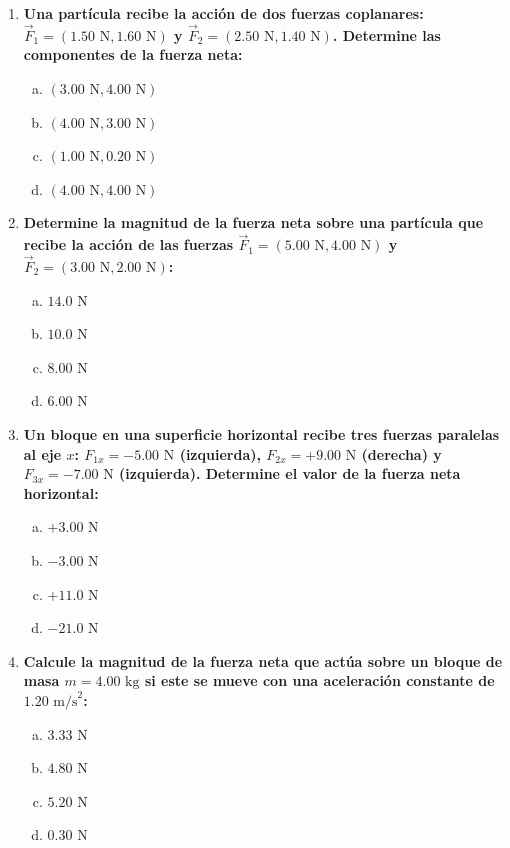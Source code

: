 \documentclass[11pt,a4paper]{article}
\begin{document}
\begin{enumerate}
    \item \textbf{Una partícula recibe la acción de dos fuerzas coplanares: $\vec{F}_1 = (1.50 \text{ N}, 1.60 \text{ N})$ y $\vec{F}_2 = (2.50 \text{ N}, 1.40 \text{ N})$. Determine las componentes de la fuerza neta:}
    \begin{enumerate}[a)]
        \item $(3.00 \text{ N}, 4.00 \text{ N})$
        \item $(4.00 \text{ N}, 3.00 \text{ N})$
        \item $(1.00 \text{ N}, 0.20 \text{ N})$
        \item $(4.00 \text{ N}, 4.00 \text{ N})$
    \end{enumerate}

    \item \textbf{Determine la magnitud de la fuerza neta sobre una partícula que recibe la acción de las fuerzas $\vec{F}_1 = (5.00 \text{ N}, 4.00 \text{ N})$ y $\vec{F}_2 = (3.00 \text{ N}, 2.00 \text{ N})$:}
    \begin{enumerate}[a)]
        \item $14.0 \text{ N}$
        \item $10.0 \text{ N}$
        \item $8.00 \text{ N}$
        \item $6.00 \text{ N}$
    \end{enumerate}

    \item \textbf{Un bloque en una superficie horizontal recibe tres fuerzas paralelas al eje $x$: $F_{1x} = -5.00 \text{ N}$ (izquierda), $F_{2x} = +9.00 \text{ N}$ (derecha) y $F_{3x} = -7.00 \text{ N}$ (izquierda). Determine el valor de la fuerza neta horizontal:}
    \begin{enumerate}[a)]
        \item $+3.00 \text{ N}$
        \item $-3.00 \text{ N}$
        \item $+11.0 \text{ N}$
        \item $-21.0 \text{ N}$
    \end{enumerate}

    \item \textbf{Calcule la magnitud de la fuerza neta que actúa sobre un bloque de masa $m = 4.00 \text{ kg}$ si este se mueve con una aceleración constante de $1.20 \text{ m/s}^2$:}
    \begin{enumerate}[a)]
        \item $3.33 \text{ N}$
        \item $4.80 \text{ N}$
        \item $5.20 \text{ N}$
        \item $0.30 \text{ N}$
    \end{enumerate}


\end{enumerate}
\end{document}
